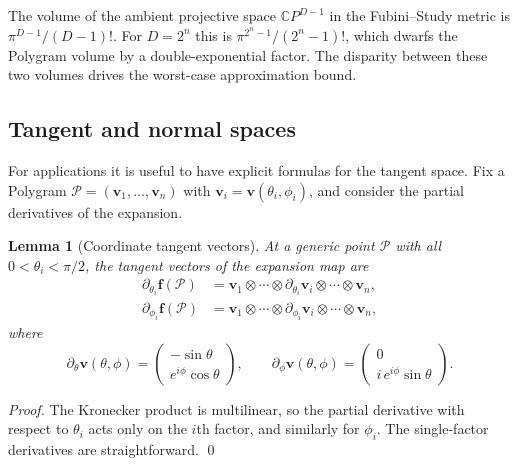 \documentclass[11pt,letterpaper]{article}
\newtheorem{lemma}[theorem]{Lemma}
\theoremstyle{definition}
\newcommand{\C}{\mathbb{C}}
\newcommand{\Polygram}{\mathcal{P}}
\begin{document}
The volume of the ambient projective space $\C P^{D-1}$ in the Fubini--Study
metric is $\pi^{D-1} / (D-1)!$. For $D = 2^{n}$ this is
$\pi^{2^{n}-1}/(2^{n}-1)!$, which dwarfs the Polygram volume by a
double-exponential factor. The disparity between these two volumes drives the
worst-case approximation bound.

\subsection{Tangent and normal spaces}

For applications it is useful to have explicit formulas for the tangent space.
Fix a Polygram $\Polygram = (\bm{v}_{1}, \dots, \bm{v}_{n})$ with $\bm{v}_{i} =
\bm{v}(\theta_{i}, \phi_{i})$, and consider the partial derivatives of the
expansion.

\begin{lemma}[Coordinate tangent vectors]
\label{lem:tangents}
At a generic point $\Polygram$ with all $0 < \theta_{i} < \pi/2$, the tangent
vectors of the expansion map are
\begin{align*}
\partial_{\theta_{i}} \bm{f}(\Polygram) &= \bm{v}_{1} \otimes \cdots
   \otimes \partial_{\theta_{i}} \bm{v}_{i} \otimes \cdots \otimes \bm{v}_{n},
\\[1mm]
\partial_{\phi_{i}} \bm{f}(\Polygram) &= \bm{v}_{1} \otimes \cdots
   \otimes \partial_{\phi_{i}} \bm{v}_{i} \otimes \cdots \otimes \bm{v}_{n},
\end{align*}
where
\[
\partial_{\theta}\bm{v}(\theta,\phi) = \begin{pmatrix} -\sin\theta \\
                                e^{i\phi}\cos\theta \end{pmatrix}, \qquad
\partial_{\phi}\bm{v}(\theta,\phi) = \begin{pmatrix} 0 \\
                                i\,e^{i\phi}\sin\theta \end{pmatrix}.
\]
\end{lemma}
\begin{proof}
The Kronecker product is multilinear, so the partial derivative with respect to
$\theta_{i}$ acts only on the $i$th factor, and similarly for $\phi_{i}$. The
single-factor derivatives are straightforward. \qed
\end{proof}
\end{document}
